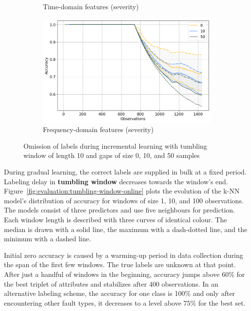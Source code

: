 \begin{figure}[]
\begin{subfigure}[b]{0.48\textwidth}
        \caption{Time-domain features (severity)}
    \end{subfigure}
    \hfill
    \begin{subfigure}[b]{0.48\textwidth}
        \includegraphics[width=\textwidth]{assets/results/incremental-learning/skip-label-FD-severity.png}
        \caption{Frequency-domain features (severity)}
    \end{subfigure} 
    \caption{Omission of labels during incremental learning with tumbling window of length 10 and gaps of size 0, 10, and 50 samples}
    \label{fig:evaluation:label-skips-online}
\end{figure}

During gradual learning, the correct labels are supplied in bulk at a fixed period. Labeling delay in \textbf{tumbling window} decreases towards the window's end. Figure~\ref{fig:evaluation:tumbling-window-online} plots the evolution of the k-NN model's distribution of accuracy for windows of size 1, 10, and 100 observations. The models consist of three predictors and use five neighbours for prediction. Each window length is described with three curves of identical colour. The median is drawn with a solid line, the maximum with a dash-dotted line, and the minimum with a dashed line.

Initial zero accuracy is caused by a warming-up period in data collection during the span of the first few windows. The true labels are unknown at that point. After just a handful of windows in the beginning, accuracy jumps above 60\% for the best triplet of attributes and stabilizes after 400 observations. In an alternative labeling scheme, the accuracy for one class is 100\% and only after encountering other fault types, it decreases to a level above 75\% for the best set.

